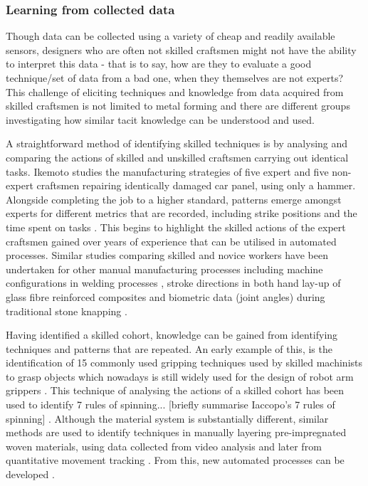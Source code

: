\subsubsection{Learning from collected data}
Though data can be collected using a variety of cheap and readily available sensors, designers who are often not skilled craftsmen might not have the ability to interpret this data - that is to say, how are they to evaluate a good technique/set of data from a bad one, when they themselves are not experts? 
This challenge of eliciting techniques and knowledge from data acquired from skilled craftsmen is not limited to metal forming and there are different groups investigating how similar tacit knowledge can be understood and used.

A straightforward method of identifying skilled techniques is by analysing and comparing the actions of skilled and unskilled craftsmen carrying out identical tasks. Ikemoto studies the manufacturing strategies of five expert and five non-expert craftsmen repairing identically damaged car panel, using only a hammer.  Alongside completing the job to a higher standard, patterns emerge amongst experts for different metrics that are recorded, including strike positions \citep{Ikemoto2018ProcessRepair} and the time spent on tasks \citep{Ikemoto2016ARepair}. This begins to highlight the skilled actions of the expert craftsmen gained over years of experience that can be utilised in automated processes. Similar studies comparing skilled and novice workers have been undertaken for other manual manufacturing processes including machine configurations in welding processes \citep{Manorathna2017HumanAutomation}, stroke directions in both hand lay-up of glass fibre reinforced composites \citep{Xie2016EffectMethod, Kikuchi2016ResearchLay-up} and biometric data (joint angles) during traditional stone knapping \citep{Rein2014MovementTraditions}. 

Having identified a skilled cohort, knowledge can be gained from identifying techniques and patterns that are repeated. An early example of this, is the identification of 15 commonly used gripping techniques used by skilled machinists to grasp objects \citep{Cutkosky1986ModellingHands} which nowadays is still widely used for the design of robot arm grippers \citep{Feix2016TheTypes}. This technique of analysing the actions of a skilled cohort has been used to identify 7 rules of spinning... [briefly summarise Iaccopo's 7 rules of spinning] \citep{Russo2020ResearchSpinning}.
Although the material system is substantially different, similar methods are used to identify techniques in manually layering pre-impregnated woven materials, using data collected from video analysis \citep{Elkington2015HandProcess, Elkington2015StudyingLayup} and later from quantitative movement tracking \citep{Prabhu2017DigitisationTechnology}. From this, new automated processes can be developed \citep{Elkington2016AutomatedMoulds}.

